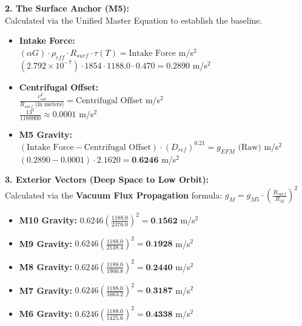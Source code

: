 \documentclass[11pt, a4paper]{article}
\begin{document}
  \vspace{1.0em}
  \noindent \textbf{2. The Surface Anchor (M5):} \\
  \hspace*{1em} Calculated via the Unified Master Equation to establish the baseline.
  \begin{itemize}
    \item \textbf{Intake Force:} \\[0.5em]
    \hspace*{2em} $(\alpha G) \cdot \rho_{eff} \cdot R_{surf} \cdot \tau(T) = \text{Intake Force}$ m/s$^2$ \\[1em]
    \hspace*{2em} $(2.792 \times 10^{-7}) \cdot 1854 \cdot 1188.0 \cdot 0.470 = 0.2890$ m/s$^2$
    
    \item \textbf{Centrifugal Offset:} \\[0.5em]
    \hspace*{2em} $\frac{v_{rot}^2}{R_{surf} \text{ (in meters)}} = \text{Centrifugal Offset}$ m/s$^2$ \\[1em]
    \hspace*{2em} $\frac{13^2}{1188000} \approx 0.0001$ m/s$^2$
    
    \item \textbf{M5 Gravity:} \\[0.5em]
    \hspace*{2em} $(\text{Intake Force} - \text{Centrifugal Offset}) \cdot (D_{ref})^{0.21} = g_{EFM} \text{ (Raw)}$ m/s$^2$ \\[1em]
    \hspace*{2em} $(0.2890 - 0.0001) \cdot 2.1620 = \textbf{0.6246}$ m/s$^2$
  \end{itemize}

  \clearpage
  \noindent \textbf{3. Exterior Vectors (Deep Space to Low Orbit):} \\
  \hspace*{1em} Calculated via the \textbf{Vacuum Flux Propagation} formula: $g_M = g_{M5} \cdot \left( \frac{R_{surf}}{R_M} \right)^2$
  \begin{itemize}
    \item \textbf{M10 Gravity:} $0.6246 \left( \frac{1188.0}{2376.0} \right)^2 = \textbf{0.1562}$ m/s$^2$
    \item \textbf{M9 Gravity:} $0.6246 \left( \frac{1188.0}{2138.4} \right)^2 = \textbf{0.1928}$ m/s$^2$
    \item \textbf{M8 Gravity:} $0.6246 \left( \frac{1188.0}{1900.8} \right)^2 = \textbf{0.2440}$ m/s$^2$
    \item \textbf{M7 Gravity:} $0.6246 \left( \frac{1188.0}{1663.2} \right)^2 = \textbf{0.3187}$ m/s$^2$
    \item \textbf{M6 Gravity:} $0.6246 \left( \frac{1188.0}{1425.6} \right)^2 = \textbf{0.4338}$ m/s$^2$
  \end{itemize}
\end{document}
